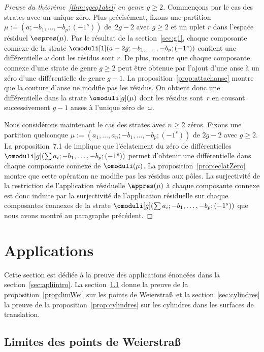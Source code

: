 \begin{proof}[Preuve du théorème~\ref{thm:ggeq1abel} en genre $g\geq2$]
Commençons par le cas des strates avec un unique zéro. Plus précisément, fixons une partition $\mu:=(a;-b_{1},\dots,-b_{p};(-1^{s}))$ de~$2g-2$ avec $g\geq2$ et un uplet $r$ dans l'espace résiduel $\espres(\mu)$. Par le résultat de la section~\ref{sec:g1}, chaque composante connexe de la strate $\omoduli[1](a-2g;-b_{1},\dots,-b_{p};(-1^{s}))$ contient une différentielle $\omega$ dont les résidus sont $r$. De plus, \cite[Prop.\,6.1]{Bo} montre que chaque composante connexe d'une strate de genre $g \geq 2$ peut être obtenue par l'ajout d'une anse à un zéro d'une différentielle de genre $g-1$. La proposition~\ref{prop:attachanse} montre que la couture d'anse ne modifie pas les résidus. On obtient donc une différentielle dans la strate $\omoduli[g](\mu)$ dont les résidus sont~$r$ en cousant successivement $g-1$ anses à l'unique zéro de~$\omega$.

Nous considérons maintenant le cas des strates avec $n\geq 2$ zéros. Fixons une partition quelconque $\mu:=(a_{1},\ldots,a_{n};-b_{1},\dots,-b_{p};(-1^{s}))$ de $2g-2$ avec $g\geq2$.
La proposition~7.1 de \cite{Bo} implique que l'éclatement du zéro de différentielles $\omoduli[g](\sum a_{i};-b_{1},\dots,-b_{p};(-1^{s}))$ permet d'obtenir une différentielle dans chaque composante connexe de $\omoduli(\mu)$. La proposition~\ref{prop:eclatZero} montre que cette opération ne modifie pas les résidus aux pôles. La surjectivité de la restriction de l'application résiduelle $\appres(\mu)$ à chaque composante connexe est donc induite par la surjectivité de l'application résiduelle sur chaque composantes connexes de la strate $\omoduli[g](\sum a_{i};-b_{1},\dots,-b_{p};(-1^{s}))$ que nous avons montré au paragraphe précédent.
\end{proof}

\section{Applications}
\label{sec:appli}

Cette section est dédiée à la preuve des applications énoncées dans la section~\ref{sec:apliintro}. La section~\ref{sec:limwei} donne la preuve de la proposition~\ref{prop:limWei} sur les points de Weierstra\ss~et la section~\ref{sec:cylindres} la preuve de la proposition~\ref{prop:cylindres} sur les cylindres dans les surfaces de translation.

\subsection{Limites des points de Weierstra{\normalfont\ss}}
\label{sec:limwei}

